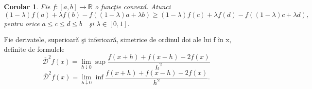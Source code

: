 \documentclass[a4paper,12pt,oneside]{report}
\newtheorem{corollary}{Corolar}
\begin{document}
\begin{corollary}
Fie \(f : \left [ a,b \right ] \rightarrow \mathbb{R}\) o func\c{t}ie convex\u{a}. Atunci
\begin{displaymath}
   \left ( 1-\lambda  \right )f\left ( a \right ) + \lambda f\left ( b \right ) - f\left ( \left ( 1-\lambda  \right )a + \lambda b \right )\geq \left ( 1-\lambda  \right )f\left ( c \right )+\lambda f\left ( d \right ) - f\left ( \left ( 1 -\lambda \right )c + \lambda d \right ),
\end{displaymath}
pentru orice \(a\leq c\leq d\leq b \)~~\c{s}i \(\lambda \in \left [ 0,1 \right ].\)
\end{corollary}
Fie derivatele, superioar\u{a} \c{s}i inferioar\u{a}, simetrice de ordinul doi ale lui f \^{i}n x, definite de formulele
\begin{displaymath}
   \overline{ \mathcal{D}}^{2}f\left ( x \right ) = \lim_{h\downarrow0} \sup\frac{f\left ( x+h \right ) + f\left ( x-h \right ) -2f\left ( x \right )}{h^{2}}
\end{displaymath}
\begin{displaymath}
   \overline{ \mathcal{D}}^{2}f\left ( x \right ) = \lim_{h\downarrow0} \inf\frac{f\left ( x+h \right ) + f\left ( x-h \right ) -2f\left ( x \right )}{h^{2}}.
\end{displaymath}
\end{document}

